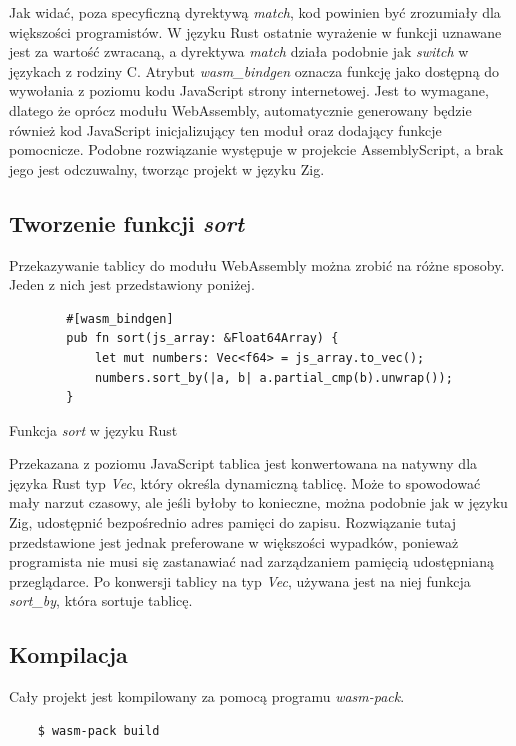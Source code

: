 \documentclass[language=polish,type=master]{aghmodern}
\begin{document}
Jak widać, poza specyficzną dyrektywą \emph{match}, kod powinien być zrozumiały dla większości programistów.
W języku Rust ostatnie wyrażenie w funkcji uznawane jest za wartość zwracaną, a dyrektywa \emph{match} działa podobnie jak \emph{switch} w językach z rodziny C.
Atrybut \emph{wasm\_bindgen} oznacza funkcję jako dostępną do wywołania z poziomu kodu JavaScript strony internetowej.
Jest to wymagane, dlatego że oprócz modułu WebAssembly, automatycznie generowany będzie również kod JavaScript inicjalizujący ten moduł oraz dodający funkcje pomocnicze.
Podobne rozwiązanie występuje w projekcie AssemblyScript, a brak jego jest odczuwalny, tworząc projekt w języku Zig.

\clearpage

\subsection{Tworzenie funkcji \emph{sort}}
Przekazywanie tablicy do modułu WebAssembly można zrobić na różne sposoby.
Jeden z nich jest przedstawiony poniżej.

\begin{listing}[H]
    \begin{verbatim}
        #[wasm_bindgen]
        pub fn sort(js_array: &Float64Array) {
            let mut numbers: Vec<f64> = js_array.to_vec();
            numbers.sort_by(|a, b| a.partial_cmp(b).unwrap());
        }
    \end{verbatim}
    \caption{Funkcja \emph{sort} w języku Rust}
\end{listing}

Przekazana z poziomu JavaScript tablica jest konwertowana na natywny dla języka Rust typ \emph{Vec}, który określa dynamiczną tablicę.
Może to spowodować mały narzut czasowy, ale jeśli byłoby to konieczne, można podobnie jak w języku Zig, udostępnić bezpośrednio adres pamięci do zapisu.
Rozwiązanie tutaj przedstawione jest jednak preferowane w większości wypadków, ponieważ programista nie musi się zastanawiać nad zarządzaniem pamięcią udostępnianą przeglądarce.
Po konwersji tablicy na typ \emph{Vec}, używana jest na niej funkcja \emph{sort\_by}, która sortuje tablicę.

\subsection{Kompilacja}
Cały projekt jest kompilowany za pomocą programu \emph{wasm-pack}.

\begin{verbatim}
    $ wasm-pack build
\end{verbatim}
\end{document}
